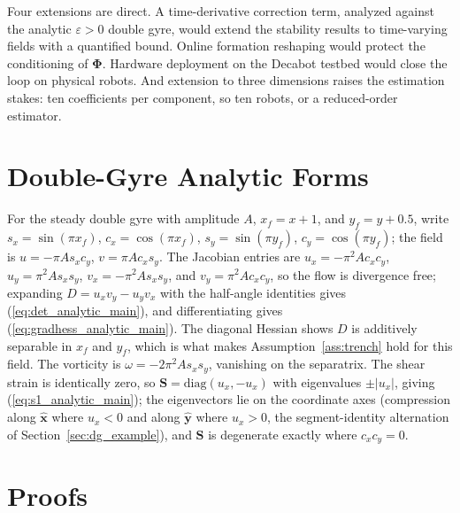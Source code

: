 \documentclass[lettersize,journal]{IEEEtran}
\begin{document}
Four extensions are direct. A time-derivative correction term,
analyzed against the analytic $\varepsilon > 0$ double gyre, would
extend the stability results to time-varying fields with a quantified
bound. Online formation reshaping would protect the conditioning of
$\boldsymbol{\Phi}$. Hardware deployment on the Decabot testbed would
close the loop on physical robots. And extension to three dimensions
raises the estimation stakes: ten coefficients per component, so ten
robots, or a reduced-order estimator.


\appendices

\section{Double-Gyre Analytic Forms}
\label{app:analytic}

For the steady double gyre with amplitude $A$, $x_f = x + 1$, and
$y_f = y + 0.5$, write $s_x = \sin(\pi x_f)$, $c_x = \cos(\pi x_f)$,
$s_y = \sin(\pi y_f)$, $c_y = \cos(\pi y_f)$; the field is
$u = -\pi A s_x c_y$, $v = \pi A c_x s_y$. The Jacobian entries are
$u_x = -\pi^2 A c_x c_y$, $u_y = \pi^2 A s_x s_y$,
$v_x = -\pi^2 A s_x s_y$, and $v_y = \pi^2 A c_x c_y$,
so the flow is divergence free; expanding $D = u_x v_y - u_y v_x$ with
the half-angle identities gives (\ref{eq:det_analytic_main}), and
differentiating gives (\ref{eq:gradhess_analytic_main}). The diagonal
Hessian shows $D$ is additively separable in $x_f$ and $y_f$, which is
what makes Assumption~\ref{ass:trench} hold for this field. The
vorticity is $\omega = -2\pi^2 A s_x s_y$, vanishing on the separatrix.
The shear strain is identically zero, so $\mathbf{S} =
\mathrm{diag}(u_x, -u_x)$ with eigenvalues $\pm|u_x|$, giving
(\ref{eq:s1_analytic_main}); the eigenvectors lie on the coordinate
axes (compression along $\hat{\mathbf{x}}$ where $u_x < 0$ and along
$\hat{\mathbf{y}}$ where $u_x > 0$, the segment-identity alternation of
Section~\ref{sec:dg_example}), and $\mathbf{S}$ is degenerate exactly
where $c_x c_y = 0$.


\section{Proofs}
\label{app:proofs}
\end{document}
